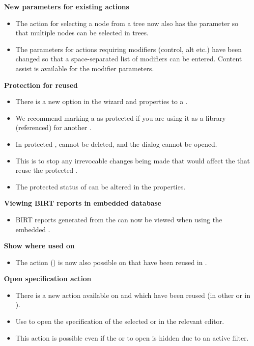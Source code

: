 \documentclass[en,a4paper,twoside,manual,guidancer]{bxreport}
\begin{document}
\textbf{New parameters for existing actions}
\begin{itemize}
\item The action for selecting a node from a tree now also has the parameter  so that multiple nodes can be selected in trees.
\item The parameters for actions requiring modifiers (control, alt etc.) have been changed so that a space-separated list of modifiers can be entered. Content assist is available for the modifier parameters.
\end{itemize}

\textbf{Protection for reused \gdprojects{}}
\begin{itemize}
\item There is a new option in the \gdproject{} wizard and \gdproject{} properties to  a \gdproject{}. 
\item We recommend marking a \gdproject{} as protected if you are using it as a library (referenced) \gdproject{} for another \gdproject{}.
\item In protected \gdprojects{}, \gdcases{} cannot be deleted, and the  dialog cannot be opened. 
\item This is to stop any irrevocable changes being made that would affect the \gdprojects{} that reuse the protected \gdproject{}.
\item The protected status of \gdprojects{} can be altered in the \gdproject{} properties.
\end{itemize}
\textbf{Viewing BIRT reports in embedded database}
\begin{itemize}
\item BIRT reports generated from the \gdtestsummaryview{} can now be viewed when using the  embedded \gddb{}.
\end{itemize}
\textbf{Show where used on \gdsuite{}}
\begin{itemize}
\item The action  () is now also possible on \gdsuites{} that have been reused in \gdjobs{}.
\end{itemize}
\textbf{Open specification action}
\begin{itemize}
\item There is a new action available on \gdcases{} and \gdsuites{} which have been reused (in other \gdcases{} or in \gdjobs{}). 
\item Use  to open the specification of the selected \gdcase{} or \gdsuite{} in the relevant editor.
\item This action is possible even if the \gdcase{} or \gdsuite{} to open is hidden due to an active filter. 
\end{itemize}
\end{document}
